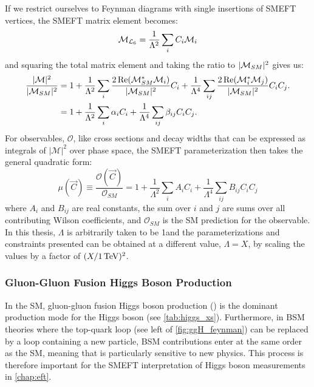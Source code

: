 If we restrict ourselves to Feynman diagrams with single insertions of SMEFT vertices, the SMEFT matrix element becomes:
\begin{equation}
  \mathcal{M}_{\mathcal{L}_6} = \frac{1}{\Lambda^2} \sum_i C_i \mathcal{M}_i
\end{equation}
and squaring the total matrix element and taking the ratio to $\lvert \mathcal{M}_{SM} \rvert^2$ gives us:
\begin{align}
  \frac{\lvert \mathcal{M} \rvert^2}{\lvert \mathcal{M}_{SM} \rvert^2} &= 1 + \frac{1}{\Lambda^2} \sum_i \frac{2\operatorname{Re}(\mathcal{M}_{SM}^* \mathcal{M}_i)}{\lvert \mathcal{M}_{SM} \rvert^2} C_i + \frac{1}{\Lambda^4} \sum_{ij} \frac{2\operatorname{Re}(\mathcal{M}_i^* \mathcal{M}_j)}{\lvert \mathcal{M}_{SM} \rvert^2} C_i C_j. \\
  &= 1 + \frac{1}{\Lambda^2} \sum_i \alpha_i C_i + \frac{1}{\Lambda^4} \sum_{ij} \beta_{ij} C_i C_j.
\end{align}
For observables, $\mathcal{O}$, like cross sections and decay widths that can be expressed as integrals of $|\mathcal{M}|^2$ over phase space, the SMEFT parameterization then takes the general quadratic form:
\begin{equation}
  \mu (\vec{C}) \equiv \frac{\mathcal{O}(\vec{C})}{\mathcal{O}_{SM}} = 1 + \frac{1}{\Lambda^2} \sum_i A_i C_i + \frac{1}{\Lambda^4} \sum_{ij} B_{ij} C_i C_j
\end{equation}
where $A_i$ and $B_{ij}$ are real constants, the sum over $i$ and $j$ are sums over all contributing Wilson coefficients, and $\mathcal{O}_{SM}$ is the SM prediction for the observable. In this thesis, $\Lambda$ is arbitrarily taken to be 1\TeV and the parameterizations and constraints presented can be obtained at a different value, $\Lambda = X$, by scaling the values by a factor of $(X/1 \,\text{Te\hspace{-.08em}V})^2$.

\subsubsection{Gluon-Gluon Fusion Higgs Boson Production}
In the SM, gluon-gluon fusion Higgs boson production (\ggH) is the dominant production mode for the Higgs boson (see \cref{tab:higgs_xs}). Furthermore, in BSM theories where the top-quark loop (see left of \cref{fig:ggH_feynman}) can be replaced by a loop containing a new particle, BSM contributions enter at the same order as the SM, meaning that \ggH is particularly sensitive to new physics. This process is therefore important for the SMEFT interpretation of Higgs boson measurements in \cref{chap:eft}. 

